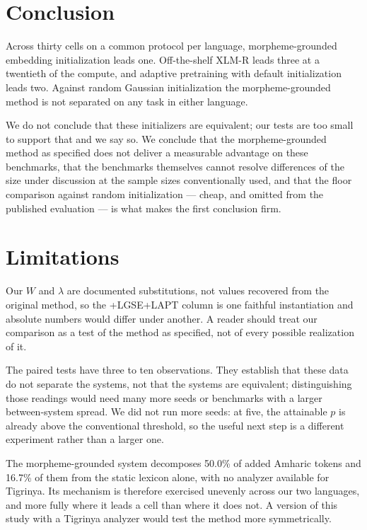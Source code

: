\documentclass[11pt]{article}
\begin{document}
\section{Conclusion}

Across thirty cells on a common protocol per language, morpheme-grounded
embedding initialization leads one. Off-the-shelf XLM-R leads three at a
twentieth of the compute, and adaptive pretraining with default
initialization leads two. Against random Gaussian initialization the
morpheme-grounded method is not separated on any task in either language.

We do not conclude that these initializers are equivalent; our tests are too
small to support that and we say so. We conclude that the morpheme-grounded
method as specified does not deliver a measurable advantage on these
benchmarks, that the benchmarks themselves cannot resolve differences of the
size under discussion at the sample sizes conventionally used, and that the
floor comparison against random initialization --- cheap, and omitted from
the published evaluation --- is what makes the first conclusion firm.

\section*{Limitations}

Our $W$ and $\lambda$ are documented substitutions, not values recovered from
the original method, so the \textsc{+LGSE+LAPT} column is one faithful
instantiation and absolute numbers would differ under another. A reader
should treat our comparison as a test of the method as specified, not of
every possible realization of it.

The paired tests have three to ten observations. They establish that these
data do not separate the systems, not that the systems are equivalent;
distinguishing those readings would need many more seeds or benchmarks with a
larger between-system spread. We did not run more seeds: at five, the
attainable $p$ is already above the conventional threshold, so the useful
next step is a different experiment rather than a larger one.

The morpheme-grounded system decomposes 50.0\% of added Amharic tokens and
16.7\% of them from the static lexicon alone, with no analyzer available for
Tigrinya. Its mechanism is therefore exercised unevenly across our two
languages, and more fully where it leads a cell than where it does not. A
version of this study with a Tigrinya analyzer would test the method more
symmetrically.
\end{document}
